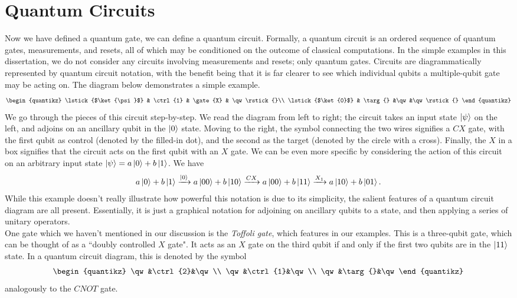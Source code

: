 \documentclass[12pt,a4paper]{report}
\numberwithin{equation}{section}
\theoremstyle{definition}
\theoremstyle{theorem}
\theoremstyle{theorem}
\theoremstyle{example}
\theoremstyle{definition}
\begin{document}
\section{Quantum Circuits}
Now we have defined a quantum gate, we can define a quantum circuit. Formally, a quantum circuit is an ordered sequence of quantum gates, measurements, and resets, all of which may be conditioned on the outcome of classical computations. In the simple examples in this dissertation, we do not consider any circuits involving measurements and resets; only quantum gates. Circuits are diagrammatically represented by quantum circuit notation, with the benefit being that it is far clearer to see which individual qubits a multiple-qubit gate may be acting on. The diagram below demonstrates a simple example.
\begin{equation}
	\begin{quantikz}
		\lstick{$\ket{\psi}$} & \ctrl{1} & \gate{X} & \qw\rstick{}\\
		\lstick{$\ket{0}$} & \targ{} &\qw &\qw\rstick{}
	\end{quantikz}
\end{equation}
We go through the pieces of this circuit step-by-step. We read the diagram from left to right; the circuit takes an input state $\ket{\psi}$ on the left, and adjoins on an ancillary qubit in the $\ket{0}$ state. Moving to the right, the symbol connecting the two wires signifies a $CX$ gate, with the first qubit as control (denoted by the filled-in dot), and the second as the target (denoted by the circle with a cross). Finally, the $X$ in a box signifies that the circuit acts on the first qubit with an $X$ gate. We can be even more specific by considering the action of this circuit on an arbitrary input state $\ket{\psi}=a\ket{0}+b\ket{1}$. We have
\begin{equation}
	\begin{aligned}
		a\ket{0}+b\ket{1}\xrightarrow{\ket{0}}a\ket{00}+b\ket{10}
		\xrightarrow{CX}a\ket{00}+b\ket{11}
		\xrightarrow{X_{1}}a\ket{10}+b\ket{01}.
	\end{aligned}
\end{equation}
While this example doesn't really illustrate how powerful this notation is due to its simplicity, the salient features of a quantum circuit diagram are all present. Essentially, it is just a graphical notation for adjoining on ancillary qubits to a state, and then applying a series of unitary operators.\\
One gate which we haven't mentioned in our discussion is the \textit{Toffoli gate}, which features in our examples. This is a three-qubit gate, which can be thought of as a ``doubly controlled $X$ gate". It acts as an $X$ gate on the third qubit if and only if the first two qubits are in the $\ket{11}$ state. In a quantum circuit diagram, this is denoted by the symbol
\begin{equation}
	\begin{quantikz}
		\qw&\ctrl{2}&\qw\\
		\qw&\ctrl{1}&\qw\\
		\qw&\targ{}&\qw
	\end{quantikz}
\end{equation}
analogously to the $CNOT$ gate.
\end{document}
